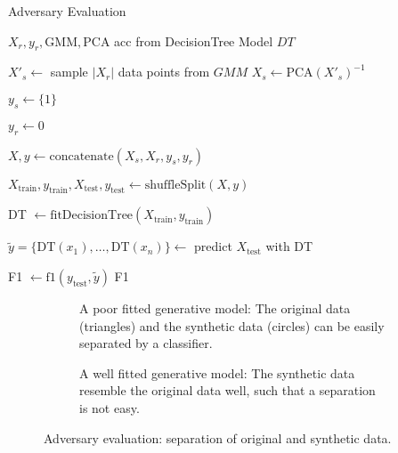  \begin{algorithm}
    \caption{Adversary Evaluation}
    \label{alg:ml_efficacy}
 
    \begin{algorithmic}[1]
        \REQUIRE $X_r, y_r, \text{GMM}, \text{PCA}$
        \ENSURE acc from DecisionTree Model $DT$

        \STATE $X'_s \leftarrow$ sample $|X_r|$ data points from $GMM$
        \STATE $X_s \leftarrow \text{PCA}(X'_s)^{-1}$  

        \STATE $y_s \leftarrow \{ 1 \}$ 

        \STATE $y_r \leftarrow 0$ 
        
        \STATE $X, y \leftarrow \text{concatenate}(X_s, X_r, y_s, y_r)$
        
        \STATE $X_{\text{train}}, y_{\text{train}}, X_{\text{test}}, y_{\text{test}} \leftarrow \text{shuffleSplit}(X,y)$

        \STATE DT $\leftarrow \text{fitDecisionTree}(X_{\text{train}}, y_{\text{train}})$

        \STATE $\tilde{y} = \{\text{DT}(x_1), \dots, \text{DT}(x_n)\} \leftarrow$ predict $X_{\text{test}}$ with DT

        \STATE F1 $\leftarrow \text{f1}(y_{\text{test}}, \tilde{y})$
        \RETURN F1
    \end{algorithmic}
 \end{algorithm}


 \begin{figure}%
    \centering%
    \begin{subfigure}[b]{0.49\textwidth}%
        \centering\captionsetup{width=.8\linewidth}%
        \caption{A poor fitted generative model: The original data (triangles) and the synthetic data (circles) can be easily separated by a classifier.}%
        \label{subfig:adversary_evaluation_bad}%
    \end{subfigure}%
    \hfill%
    \begin{subfigure}[b]{0.49\textwidth}%
        \centering\captionsetup{width=.8\linewidth}%
        \caption{A well fitted generative model: The synthetic data resemble the original data well, such that a separation is not easy.}%
        \label{subfig:adversary_evaluation_good}%
    \end{subfigure}%
    \caption{Adversary evaluation: separation of original and synthetic data.}%
    \label{fig:adversary_evaluation}%
\end{figure}%
